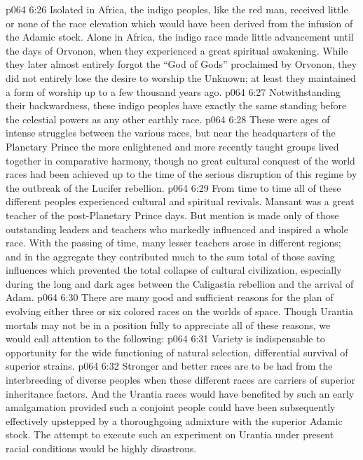 \vs p064 6:26 Isolated in Africa, the indigo peoples, like the red man, received little or none of the race elevation which would have been derived from the infusion of the Adamic stock. Alone in Africa, the indigo race made little advancement until the days of Orvonon, when they experienced a great spiritual awakening. While they later almost entirely forgot the “God of Gods” proclaimed by Orvonon, they did not entirely lose the desire to worship the Unknown; at least they maintained a form of worship up to a few thousand years ago.
\vs p064 6:27 Notwithstanding their backwardness, these indigo peoples have exactly the same standing before the celestial powers as any other earthly race.
\pc \vs p064 6:28 These were ages of intense struggles between the various races, but near the headquarters of the Planetary Prince the more enlightened and more recently taught groups lived together in comparative harmony, though no great cultural conquest of the world races had been achieved up to the time of the serious disruption of this regime by the outbreak of the Lucifer rebellion.
\pc \vs p064 6:29 From time to time all of these different peoples experienced cultural and spiritual revivals. Mansant was a great teacher of the post\hyp{}Planetary Prince days. But mention is made only of those outstanding leaders and teachers who markedly influenced and inspired a whole race. With the passing of time, many lesser teachers arose in different regions; and in the aggregate they contributed much to the sum total of those saving influences which prevented the total collapse of cultural civilization, especially during the long and dark ages between the Caligastia rebellion and the arrival of Adam.
\pc \vs p064 6:30 There are many good and sufficient reasons for the plan of evolving either three or six colored races on the worlds of space. Though Urantia mortals may not be in a position fully to appreciate all of these reasons, we would call attention to the following:
\pc \vs p064 6:31 \bibnobreakspace Variety is indispensable to opportunity for the wide functioning of natural selection, differential survival of superior strains.
\pc \vs p064 6:32 \bibnobreakspace Stronger and better races are to be had from the interbreeding of diverse peoples when these different races are carriers of superior inheritance factors. And the Urantia races would have benefited by such an early amalgamation provided such a conjoint people could have been subsequently effectively upstepped by a thoroughgoing admixture with the superior Adamic stock. The attempt to execute such an experiment on Urantia under present racial conditions would be highly disastrous.\plusone
